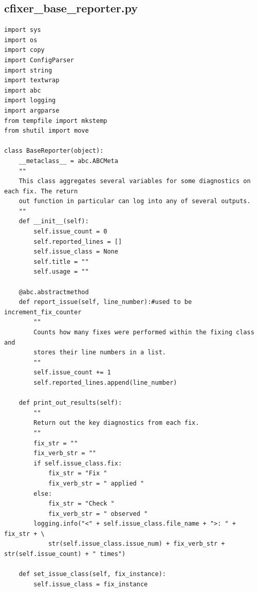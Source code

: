 \documentclass[11pt]{scrreprt}
\begin{document}
\subsection{cfixer\_base\_reporter.py}
\begin{lstlisting}[frame=single,basicstyle=\small]
import sys
import os
import copy
import ConfigParser
import string
import textwrap
import abc
import logging
import argparse
from tempfile import mkstemp
from shutil import move

class BaseReporter(object):
    __metaclass__ = abc.ABCMeta
    ""
    This class aggregates several variables for some diagnostics on each fix. The return
    out function in particular can log into any of several outputs.
    ""
    def __init__(self):
        self.issue_count = 0
        self.reported_lines = []
        self.issue_class = None
        self.title = ""
        self.usage = ""

    @abc.abstractmethod
    def report_issue(self, line_number):#used to be increment_fix_counter
        ""
        Counts how many fixes were performed within the fixing class and 
        stores their line numbers in a list.
        ""
        self.issue_count += 1
        self.reported_lines.append(line_number)

    def print_out_results(self):
        ""
        Return out the key diagnostics from each fix. 
        ""
        fix_str = ""
        fix_verb_str = ""
        if self.issue_class.fix:
            fix_str = "Fix "
            fix_verb_str = " applied "
        else:
            fix_str = "Check "
            fix_verb_str = " observed "
        logging.info("<" + self.issue_class.file_name + ">: " + fix_str + \
            str(self.issue_class.issue_num) + fix_verb_str + str(self.issue_count) + " times")

    def set_issue_class(self, fix_instance):
        self.issue_class = fix_instance

\end{lstlisting}
\end{document}
